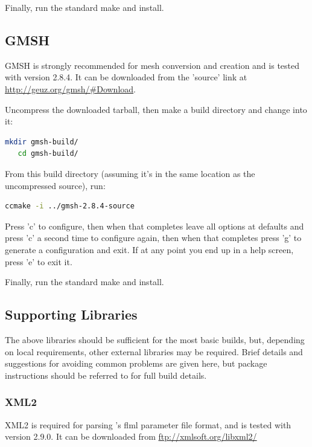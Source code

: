 Finally, run the standard make and install.

\subsection{GMSH}
\label{sec:required_libraries_gmsh}

GMSH is strongly recommended for mesh conversion and creation and is tested
with version 2.8.4. It can be downloaded from the 'source' link at
\url{http://geuz.org/gmsh/#Download}.

Uncompress the downloaded tarball, then make a build directory and change into
it:

\begin{lstlisting}[language=bash]
   mkdir gmsh-build/
   cd gmsh-build/
\end{lstlisting}

From this build directory (assuming it's in the same location as the
uncompressed source), run:

\begin{lstlisting}[language=bash]
   ccmake -i ../gmsh-2.8.4-source
\end{lstlisting}

Press 'c' to configure, then when that completes leave all options at defaults
and press 'c' a second time to configure again, then when that completes press
'g' to generate a configuration and exit. If at any point you end up in a help
screen, press 'e' to exit it.

Finally, run the standard make and install.

\subsection{Supporting Libraries}
\label{sec:required_libraries_supporting}

The above libraries should be sufficient for the most basic \fluidity builds,
but, depending on local requirements, other external libraries may be required.
Brief details and suggestions for avoiding common problems are given here, but
package instructions should be referred to for full build details.

\subsubsection{XML2}
\label{sec:required_libraries_supporting_xml2}

XML2 is required for parsing \fluidity's flml parameter file format, and is
tested with version 2.9.0. It can be downloaded from \url{ftp://xmlsoft.org/libxml2/}

